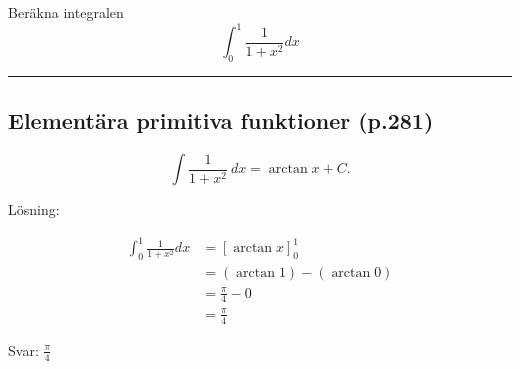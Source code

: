 \documentclass[11pt]{article}
\begin{document}
Beräkna integralen
\[
    \int_0^1 \frac{1}{1 + x^2} dx
\]

\noindent\rule{\textwidth}{0.5pt}

\subsection{Elementära primitiva funktioner (p.281)}

\[
    \int \frac{1}{1 + x^2}\ dx = \arctan x + C.
\]

Lösning:

\begin{align*}
    \int_0^1 \frac{1}{1 + x^2} dx &= \left[ \arctan x \right]_0^1\\
    &= (\arctan 1) - (\arctan 0)\\
    &= \frac{\pi}{4} - 0\\
    &= \frac{\pi}{4}
\end{align*}

Svar: $\frac{\pi}{4}$
\end{document}
